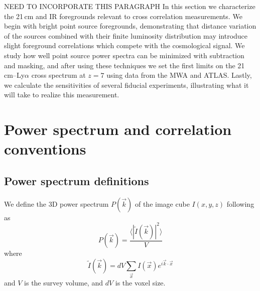 \documentclass{emulateapj}
\begin{document}
NEED TO INCORPORATE THIS PARAGRAPH
In this section we characterize the 21\,cm and IR foregrounds relevant to cross correlation measurements. We begin with bright point source foregrounds, demonstrating that distance variation of the sources combined with their finite luminosity distribution may introduce slight foreground correlations which compete with the cosmological signal. We study how well point source power spectra can be minimized with subtraction and masking, and after using these techniques we set the first limits on the 21\,cm--Ly$\alpha$ cross spectrum at $z=7$ using data from the MWA and ATLAS. Lastly, we calculate the sensitivities of several fiducial experiments, illustrating what it will take to realize this measurement.

\section{Power spectrum and correlation conventions}
\label{sec:pspecconventions}

\subsection{Power spectrum definitions}

We define the 3D power spectrum $P(\vec{k})$ of the image cube $I(x,y,z)$ following \citet{ewallwice14} as 
\begin{equation}
	P(\vec{k}) = \frac{\langle|\tilde{I}(\vec{k})|^2\rangle}{V}
\end{equation}
where
\begin{equation}
	\tilde{I}(\vec{k})=dV\sum_{\vec{x}}I(\vec{x})e^{i\vec{k}\cdot\vec{x}}
\end{equation}
and $V$ is the survey volume, and $dV$ is the voxel size.
\end{document}
